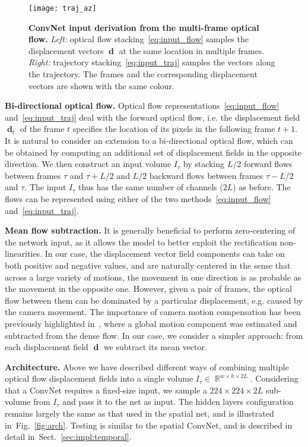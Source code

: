 \documentclass{article} \usepackage{nips14submit_e,times}
\makeatletter
\newcommand{\figref}[1]{Fig.~\ref{#1}}
\newcommand{\sref}[1]{Sect.~\ref{#1}}
\newcommand*{\eg}{e.g.\@\xspace}
\newcommand*{\ie}{i.e.\@\xspace}
\DeclareMathOperator{\Rbb}{\mathbb{R}}
\DeclareMathOperator{\dvec}{\mathrm{\textbf{d}}}
\makeatother
\begin{document}
\begin{figure}[ht]
\centering
\texttt{[image: traj\_az]}
\caption{\textbf{ConvNet input derivation from the multi-frame optical flow.}
\emph{Left:} optical flow stacking~\eqref{eq:input_flow} samples the displacement vectors $\dvec$ at the same location in multiple frames.
\emph{Right:} trajectory stacking~\eqref{eq:input_traj} samples the vectors along the trajectory. The frames and the
corresponding displacement vectors are shown with the same colour.
}
\label{fig:traj}
\end{figure}


\noindent\textbf{Bi-directional optical flow.}
Optical flow representations~\eqref{eq:input_flow} and~\eqref{eq:input_traj} deal with the forward optical flow, \ie the displacement field $\dvec_t$ of the frame $t$ specifies the location of its pixels
in the following frame $t+1$. It is natural to consider an extension to a bi-directional optical flow, which can be obtained by computing an additional set of displacement fields in the opposite direction.
We then construct an input volume $I_{\tau}$ by stacking $L/2$ forward flows between frames $\tau$ and $\tau+L/2$ and $L/2$ backward flows between frames $\tau-L/2$ and $\tau$. The input $I_{\tau}$ 
thus has the same number of channels ($2L$) as before. The flows can be represented using either of the two methods~\eqref{eq:input_flow} and~\eqref{eq:input_traj}.

\noindent\textbf{Mean flow subtraction.}
It is generally beneficial to perform zero-centering of the network input, as it allows the model to better exploit the rectification non-linearities.
In our case, the displacement vector field components can take on both positive and negative values, and are naturally centered in the sense that across a large variety of motions,
the movement in one direction is as probable as the movement in the opposite one. However, given a pair of frames, the optical flow between them can be dominated by a particular
displacement, \eg caused by the camera movement. 
The importance of camera motion compensation has been previously highlighted in~\cite{Jain13,Wang13b}, where a global motion component was estimated and subtracted from the dense flow.
In our case, we consider a simpler approach: from each displacement field $\dvec$ we subtract its mean vector. 


\noindent\textbf{Architecture.} Above we have described different ways of combining multiple optical flow displacement fields into a single volume $I_{\tau} \in \Rbb^{w \times h \times 2L}$.
Considering that a ConvNet requires a fixed-size input, we sample a $224\times224\times2L$ sub-volume from $I_{\tau}$ and pass it to the net as input.
The hidden layers configuration remains largely the same as 
that used in the spatial net, and is illustrated in~\figref{fig:arch}.
Testing is similar to the spatial ConvNet, and is described in detail in~\sref{sec:impl:temporal}.
\end{document}

